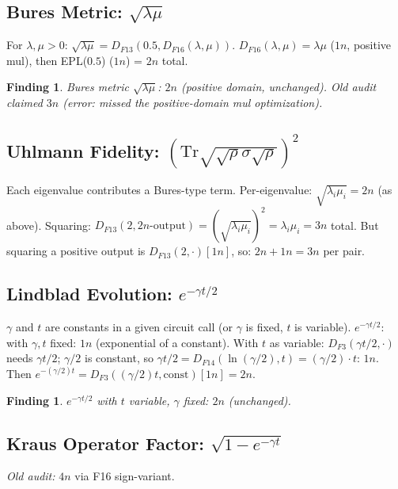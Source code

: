 \documentclass[11pt]{article}
\newtheorem{finding}[theorem]{Finding}
\newcommand{\ok}[1]{\textcolor{ok}{#1}}
\begin{document}
\subsection{Bures Metric: $\sqrt{\lambda\mu}$}

For $\lambda, \mu > 0$: $\sqrt{\lambda\mu} = D_{F13}(0.5, D_{F16}(\lambda,\mu))$.
$D_{F16}(\lambda,\mu) = \lambda\mu$ ($1n$, positive mul), then EPL($0.5$) ($1n$) = $2n$ total.

\begin{finding}
Bures metric $\sqrt{\lambda\mu}$: \ok{$2n$ (positive domain, unchanged)}.
Old audit claimed $3n$ (error: missed the positive-domain mul optimization).
\end{finding}

\subsection{Uhlmann Fidelity: $(\mathrm{Tr}\sqrt{\sqrt{\rho}\sigma\sqrt{\rho}})^2$}

Each eigenvalue contributes a Bures-type term. Per-eigenvalue: $\sqrt{\lambda_i\mu_i} = 2n$ (as above).
Squaring: $D_{F13}(2, 2n\text{-output}) = (\sqrt{\lambda_i\mu_i})^2 = \lambda_i\mu_i = 3n$ total. But squaring
a positive output is $D_{F13}(2, \cdot)[1n]$, so: $2n + 1n = 3n$ per pair.

\subsection{Lindblad Evolution: $e^{-\gamma t / 2}$}

$\gamma$ and $t$ are constants in a given circuit call (or $\gamma$ is fixed, $t$ is variable).
$e^{-\gamma t / 2}$: with $\gamma,t$ fixed: $1n$ (exponential of a constant).
With $t$ as variable: $D_{F3}(\gamma t/2, \cdot)$ needs $\gamma t/2$; $\gamma/2$ is constant, so
$\gamma t/2 = D_{F14}(\ln(\gamma/2), t) = (\gamma/2) \cdot t$: $1n$. Then $e^{-(\gamma/2)t} = D_{F3}((\gamma/2)t, \text{const})[1n] = 2n$.

\begin{finding}
$e^{-\gamma t/2}$ with $t$ variable, $\gamma$ fixed: \ok{$2n$ (unchanged)}.
\end{finding}

\subsection{Kraus Operator Factor: $\sqrt{1-e^{-\gamma t}}$}

\emph{Old audit:} $4n$ via F16 sign-variant.
\end{document}
